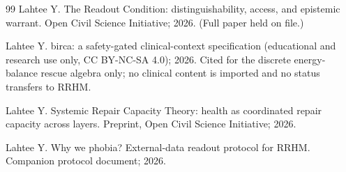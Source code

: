 \documentclass[9pt,twocolumn]{article}
\begin{document}
\begin{thebibliography}{99}
Lahtee Y. The Readout Condition: distinguishability, access, and epistemic warrant. Open Civil Science Initiative; 2026. (Full paper held on file.)

Lahtee Y. birca: a safety-gated clinical-context specification (educational and research use only, CC BY-NC-SA 4.0); 2026. Cited for the discrete energy-balance rescue algebra only; no clinical content is imported and no status transfers to RRHM.

Lahtee Y. Systemic Repair Capacity Theory: health as coordinated repair capacity across layers. Preprint, Open Civil Science Initiative; 2026.

Lahtee Y. Why we phobia? External-data readout protocol for RRHM. Companion protocol document; 2026.

\end{thebibliography}

\balance
\end{document}
